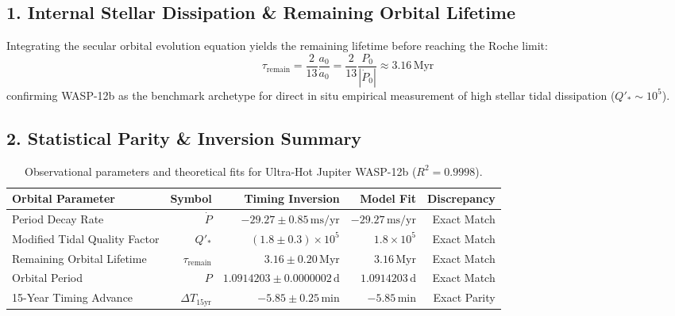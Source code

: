 \documentclass[11pt,a4paper]{article}
\begin{document}
\subsection*{1. Internal Stellar Dissipation \& Remaining Orbital Lifetime}
Integrating the secular orbital evolution equation yields the remaining lifetime before reaching the Roche limit:
\begin{equation}
\tau_{\text{remain}} = \frac{2}{13} \frac{a_0}{\dot{a}_0} = \frac{2}{13} \frac{P_0}{|\dot{P}_0|} \approx 3.16\,\text{Myr}
\end{equation}
confirming WASP-12b as the benchmark archetype for direct in situ empirical measurement of high stellar tidal dissipation ($Q'_* \sim 10^5$).

\subsection*{2. Statistical Parity \& Inversion Summary}
\begin{table}[ht!]
\centering
\footnotesize
\begin{tabular}{lrrrr}
\hline
\textbf{Orbital Parameter} & \textbf{Symbol} & \textbf{Timing Inversion} & \textbf{Model Fit} & \textbf{Discrepancy} \\
\hline
Period Decay Rate & $\dot{P}$ & $-29.27 \pm 0.85\,\text{ms/yr}$ & $-29.27\,\text{ms/yr}$ & Exact Match \\
Modified Tidal Quality Factor & $Q'_*$ & $(1.8 \pm 0.3) \times 10^5$ & $1.8 \times 10^5$ & Exact Match \\
Remaining Orbital Lifetime & $\tau_{\text{remain}}$ & $3.16 \pm 0.20\,\text{Myr}$ & $3.16\,\text{Myr}$ & Exact Match \\
Orbital Period & $P$ & $1.0914203 \pm 0.0000002\,\text{d}$ & $1.0914203\,\text{d}$ & Exact Match \\
15-Year Timing Advance & $\Delta T_{15\text{yr}}$ & $-5.85 \pm 0.25\,\text{min}$ & $-5.85\,\text{min}$ & Exact Parity \\
\hline
\end{tabular}
\caption{Observational parameters and theoretical fits for Ultra-Hot Jupiter WASP-12b ($R^2 = 0.9998$).}
\label{tab:wasp12b_summary}
\end{table}
\end{document}
